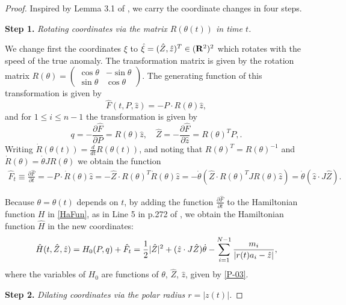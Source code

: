 \documentclass[11pt]{article}
\def\be{\begin{equation}}
\def\ee{\end{equation}}
\def\lb{\label}
\def\pt{\partial}
\def\R{{\bf R}}
\def\th{{\theta}}
\begin{document}
\begin{proof}
  Inspired by Lemma 3.1 of \cite{MS}, we carry the coordinate
  changes in four steps.
  
  {\bf Step 1.} {\it Rotating coordinates via the matrix $R(\th(t))$ in time $t$.}
  
  We change first the coordinates $\xi$ to $\hat{\xi}=(\hat{Z}, \hat{z})^T \in (\R^2)^2$
  which rotates with the speed of the true anomaly. The transformation matrix is given by the rotation
  matrix $R(\th) = (
  \begin{smallmatrix}
         \cos\th &-\sin\th \\\sin \th & \cos\th
  \end{smallmatrix})$. The generating function of this
  transformation is given by
  \be  \hat{F}(t, P, \hat{z})
         = -P\cdot R(\th)\hat{z},  \lb{P-02}\ee
  and for $1\le i\le n-1$ the transformation is given by
  \be
  q = -\frac{\pt \hat{F}}{\pt P} = R(\th)\hat{z},  \quad 
  \hat{Z} = -\frac{\pt \hat{F}}{\pt \hat{z}} = R(\th)^TP,  \lb{P-03}. \ee
  Writing $\dot{R}(\th(t))=\frac{d}{dt}R(\th(t))$, and noting that $R(\th)^T=R(\th)^{-1}$ and
  $\dot{R}(\th)=\dot{\th}JR(\th)$ we obtain the function
  \begin{align}
    \hat{F}_t
  \equiv \frac{\pt \hat{F}}{\pt t} = -P\cdot\dot{R}(\th)\hat{z} 
  = -\hat{Z}\cdot R(\th)^T\dot{R}(\th)\hat{z} 
  = -\dot{\th}\left(\hat{Z}\cdot R(\th)^TJR(\th)\hat{z}\right) 
  = \dot{\th}(\hat{z}\cdot J\hat{Z}).
  \end{align}
  
  Because $\th=\th(t)$ depends on $t$, by adding the function
  $\frac{\pt \hat{F}}{\pt t}$ to the Hamiltonian function $H$ in \eqref{HaFun}, as in Line 5 in p.272 of \cite{MS}, we obtain the Hamiltonian function $\hat{H}$ in the
  new coordinates:
  \be
  \hat{H}(t,\hat{Z},\hat{z}) = H_0(P,q) + \hat{F}_t  
  = \frac{1}{2}|\hat{Z}|^2 + (\hat{z}\cdot J\hat{Z})\dot{\th}
               - \sum_{i=1}^{N-1}{m_i\over|r(t)a_i-\hat{z}|},   \lb{P-07}
  \ee
  where the variables of $H_0$ are functions of $\th$, $\hat{Z}$, $\hat{z}$,  given by \eqref{P-03}.
  
  
  {\bf Step 2.} {\it Dilating coordinates via the polar radius $r=|z(t)|$.}
  

\end{proof}
\end{document}
